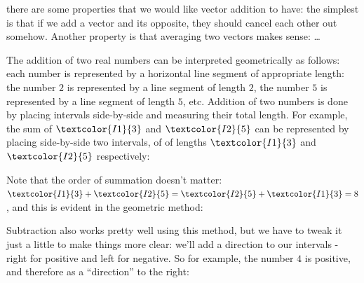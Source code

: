 \begin{descitemize}
	\def\three{\textcolor{I1}{3}}
	\def\five{\textcolor{I2}{5}}
	\item[Vector addition] there are some properties that we would like vector addition to have: the simplest is that if we add a vector and its opposite, they should cancel each other out somehow. Another property is that averaging two vectors makes sense: \dots

	The addition of two real numbers can be interpreted geometrically as follows: each number is represented by a horizontal line segment of appropriate length: the number $2$ is represented by a line segment of length $2$, the number $5$ is represented by a line segment of length $5$, etc. Addition of two numbers is done by placing intervals side-by-side and measuring their total length. For example, the sum of $\three$ and $\five$ can be represented by placing side-by-side two intervals, of of lengths $\three$ and $\five$ respectively:

	\begin{center}
	\end{center}

	Note that the order of summation doesn't matter: $\three+\five = \five+\three=8$, and this is evident in the geometric method:

	\begin{center}
	\end{center}

	Subtraction also works pretty well using this method, but we have to tweak it just a little to make things more clear: we'll add a direction to our intervals - right for positive and left for negative. So for example, the number $4$ is positive, and therefore as a \enquote{direction} to the right:


\end{descitemize}
